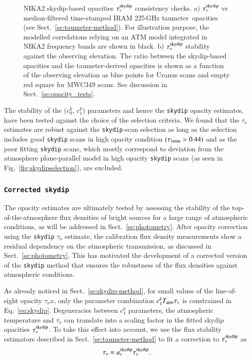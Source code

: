 \documentclass[traditionalabstract]{aa}
\newcommand{\taunu}{\tau_{\nu}}
\newcommand{\taumeter}{taumeter}
\newcommand{\lp}[1]{#1}
\begin{document}
\begin{figure}[!thbp]
\begin{center}
   \caption[]{NIKA2
     skydip-based opacities $\taunu^{\rm{skydip}}$ consistency checks.
     a) $\taunu^{\rm{skydip}}$ vs median-filtered
    time-stamped IRAM 225\,GHz \taumeter\ opacities (see
    Sect.~\ref{se:taumeter-method}).
    For illustration purpose, the modelled correlations relying on an ATM model integrated in
    NIKA2 frequency bands are shown in black. b) $\taunu^{\rm{skydip}}$ stability against the observing
    elevation. The ratio between the skydip-based opacities and the
    \taumeter-derived opacities is shown as a function of the observing
    elevation as blue points for Uranus scans and empty red square for
    MWC349 scans. See discussion in Sect.~\ref{se:opacity_tests}. } 
\label{fig:skydip-to-taumeter-correl}
\end{center}
\end{figure}
%
The stability of the ($c_0^k$, $c_1^k$) parameters and hence the
{\tt skydip} opacity estimates, have been tested against the
choice of the selection criteria. We found that the $\taunu$
estimates are robust against the {\tt skydip}-scan selection as long as the
selection includes good {\tt skydip} scans in high opacity condition
$(\tau_{1\rm{mm}} > 0.44)$ and as the poor
fitting {\tt skydip} scans, which mostly correspond to deviation from the
atmosphere plane-parallel model in high opacity {\tt skydip} scans (as seen in
Fig.~\ref{fig:skydipselection}), are excluded.

\subsubsection{{\tt Corrected skydip}}
\label{se:corrected-skydip}
The opacity estimates are ultimately tested by assessing the
stability of the top-of-the-atmosphere flux densities of bright sources for a large
range of atmospheric conditions, as will be addressed in
Sect.~\ref{se:photometry}. After opacity correction using the
{\tt skydip} $\taunu$ estimate, the calibration flux density
measurements show a residual dependency on the atmospheric
transmission, as discussed in Sect.~\ref{se:photometry}. This has
motivated the development of a corrected version of the {\tt skydip}
method that ensures the robustness of the flux densities against
atmospheric conditions.

{\lp As already noticed in Sect.~\ref{se:skydip-method}, for small values of the
line-of-sight opacity $\taunu x$, only the parameter combination
$c_1^k T_{\rm{atm}}\taunu$ is constrained in
Eq.~\ref{eq:skydip}. Degeneracies between $c_1^k$ parameters, the
atmospheric temperature and $\taunu$ can translate into a
scaling factor in the fitted skydip opacities
$\taunu^{\rm{skydip}}$. To take this effect into account, }  
we use the flux stability estimators described in
Sect.~\ref{se:taumeter-method} to fit a correction to $\taunu^{\rm{skydip}}$ as
\begin{equation}  
  \taunu =  a_\nu^{\rm{skydip}}\taunu^{\rm{skydip}}.
  \label{eq:corrected_skydip}
\end{equation}
\end{document}
